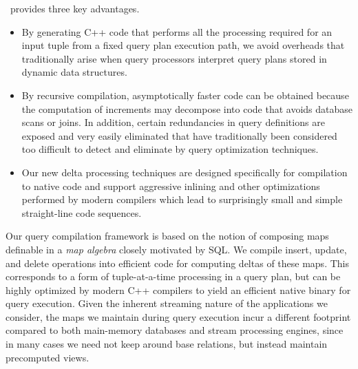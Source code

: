 \compiler\ provides three key advantages.
\begin{itemize}
\item
By generating C++  code that  performs all the  processing required  for an
input  tuple from a fixed query plan execution path, we avoid
overheads that traditionally arise when query processors interpret
query plans stored in dynamic data structures.

\item
By recursive compilation, asymptotically faster code can be obtained because
the computation of increments may decompose into code that avoids database
scans or joins.
%
In addition, certain redundancies in query definitions are exposed
and very easily eliminated that have traditionally been considered too difficult to detect and eliminate by query optimization techniques.

\item
Our new delta processing techniques are designed specifically for
compilation to native code and support aggressive inlining and other optimizations performed by modern compilers which lead to
surprisingly small and simple straight-line code sequences.
\end{itemize}



Our query compilation framework is based on the notion of composing maps
definable in a {\em map algebra}\/ closely motivated by SQL.
We compile insert, update, and delete operations into efficient code for computing
deltas of these maps. This corresponds to a form of
tuple-at-a-time processing in a query plan, but can be highly optimized by
modern C++ compilers to yield an efficient native binary for query execution.
Given the inherent streaming nature of the applications we consider, the maps we
maintain during query execution incur a different footprint compared to both
main-memory databases and stream processing engines, since in many cases we need
not keep around base relations, but instead maintain precomputed
views.



